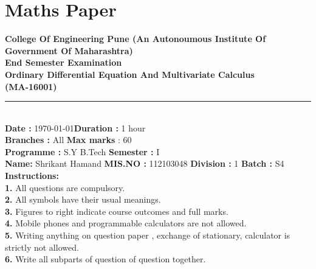 \documentclass[12pt]{article}
\begin{document}
\section{ Maths Paper}
\vspace{10mm}
\begin{center}
\huge \bf {College Of Engineering Pune} 
\linebreak \small{(An Autonoumous Institute Of Government Of Maharashtra)}\\
\vspace{10mm}
\large \textbf{End Semester Examination} \\  Ordinary Differential Equation And Multivariate Calculus
\\ (MA-16001)
\end{center}
\par\noindent\rule{\textwidth}{1pt}
\\
\vspace{5mm}
\noindent \textbf{Date :} \today \hfill \textbf {Duration :} 1 hour
\\ \textbf {Branches :} All \hfill  \textbf {Max marks} : 60
\\ \textbf {Programme :} S.Y B.Tech \hfill \textbf {Semester :} I
\linebreak
\linebreak
\\ \textbf {Name:} Shrikant Hamand \hfill \textbf{MIS.NO : }112103048
\linebreak
\linebreak
\textbf{Division :} 1 \hfill \textbf{Batch :}  S4
\linebreak
\\ \textbf{Instructions:}
\linebreak
\\ \textbf{1.} All questions are compulsory.
\\ \textbf{2.} All symbols have their usual meanings.
\\ \textbf{3.} Figures to right indicate course outcomes and full marks.
\\ \textbf{4.} Mobile phones and programmable calculators are not allowed.
\\ \textbf{5.} Writing anything on question paper , exchange of stationary, calculator is strictly not allowed.
\\ \textbf{6.} Write all subparts of question of question together.
\newpage
\newpage
\end{document}
